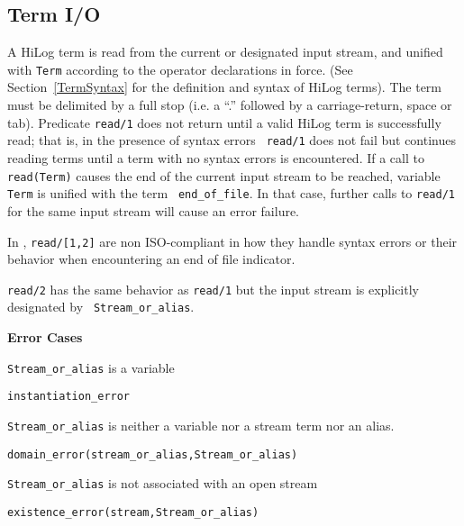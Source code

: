 \subsection{Term I/O}
\begin{description}
    A HiLog term is read from the current or designated input stream,
    and unified with {\tt Term} according to the operator declarations
    in force.  (See Section~\ref{TermSyntax} for the definition and
    syntax of HiLog terms). The term must be delimited by a full stop
    (i.e. a ``.'' followed by a carriage-return, space or tab).
    Predicate {\tt read/1} does not return until a valid HiLog term is
    successfully read; that is, in the presence of syntax errors {\tt
    read/1} does not fail but continues reading terms until a term
    with no syntax errors is encountered.  If a call to {\tt
    read(Term)} causes the end of the current input stream to be
    reached, variable {\tt Term} is unified with the term {\tt
    end\_of\_file}.  In that case, further calls to {\tt read/1} for
    the same input stream will cause an error failure.

%
In \version, {\tt read/[1,2]} are non ISO-compliant in how they
handle syntax errors or their behavior when encountering an end of
file indicator.


	{\tt read/2} has the same behavior as {\tt read/1} but the
	input stream is explicitly designated by {\tt
	Stream\_or\_alias}.

{\bf Error Cases}
\bi
\item 	{\tt Stream\_or\_alias} is a variable
\bi
\item {\tt instantiation\_error}
\ei
\item 	{\tt Stream\_or\_alias} is neither a variable nor a stream term nor an alias.
\bi
\item 	{\tt domain\_error(stream\_or\_alias,Stream\_or\_alias)}
\ei
\item 	{\tt Stream\_or\_alias} is not associated with an open stream
\bi
\item 	{\tt existence\_error(stream,Stream\_or\_alias)}
\ei
\ei


\end{description}
